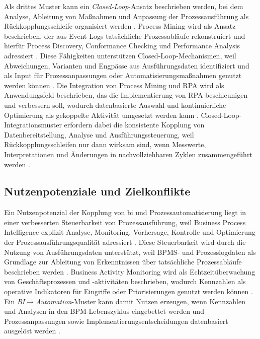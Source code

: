 Als drittes Muster kann ein \emph{Closed-Loop}-Ansatz beschrieben werden, bei dem Analyse, Ableitung von Maßnahmen und Anpassung der Prozessausführung als Rückkopplungsschleife organisiert werden \cite{Aalst2007FullBPMLifecycle,Wetzstein2008BAM}. 
Process Mining wird als Ansatz beschrieben, der aus Event Logs tatsächliche Prozessabläufe rekonstruiert und hierfür Process Discovery, Conformance Checking und Performance Analysis adressiert \cite{Aalst2016ProcessMining}. 
Diese Fähigkeiten unterstützen Closed-Loop-Mechanismen, weil Abweichungen, Varianten und Engpässe aus Ausführungsdaten identifiziert und als Input für Prozessanpassungen oder Automatisierungsmaßnahmen genutzt werden können \cite{Aalst2016ProcessMining,Aalst2007FullBPMLifecycle}. 
Die Integration von Process Mining und RPA wird als Anwendungsfeld beschrieben, das die Implementierung von RPA beschleunigen und verbessern soll, wodurch datenbasierte Auswahl und kontinuierliche Optimierung als gekoppelte Aktivität umgesetzt werden kann \cite{ElGharibAmyot2023SLR}. 
Closed-Loop-Integrationsmuster erfordern dabei die konsistente Kopplung von Datenbereitstellung, Analyse und Ausführungssteuerung, weil Rückkopplungsschleifen nur dann wirksam sind, wenn Messwerte, Interpretationen und Änderungen in nachvollziehbaren Zyklen zusammengeführt werden \cite{Aalst2007FullBPMLifecycle,DumasEtAl2013}. 


\subsection{Nutzenpotenziale und Zielkonflikte}
Ein Nutzenpotenzial der Kopplung von \gls{bi} und Prozessautomatisierung liegt in einer verbesserten Steuerbarkeit von Prozessausführung, weil Business Process Intelligence explizit Analyse, Monitoring, Vorhersage, Kontrolle und Optimierung der Prozessausführungsqualität adressiert \cite{Grigori2004BPI}. 
Diese Steuerbarkeit wird durch die Nutzung von Ausführungsdaten unterstützt, weil BPMS- und Prozesslogdaten als Grundlage zur Ableitung von Erkenntnissen über tatsächliche Prozessabläufe beschrieben werden \cite{Grigori2004BPI,Aalst2016ProcessMining}. 
Business Activity Monitoring wird als Echtzeitüberwachung von Geschäftsprozessen und -aktivitäten beschrieben, wodurch Kennzahlen als operative Indikatoren für Eingriffe oder Priorisierungen genutzt werden können \cite{IBMBAM}. 
Ein \emph{BI$\rightarrow$Automation}-Muster kann damit Nutzen erzeugen, wenn Kennzahlen und Analysen in den BPM-Lebenszyklus eingebettet werden und Prozessanpassungen sowie Implementierungsentscheidungen datenbasiert ausgelöst werden \cite{DumasEtAl2013,Aalst2007FullBPMLifecycle}. 

